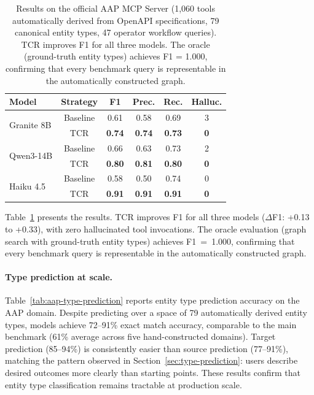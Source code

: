 \begin{table}[t]
\centering
\small
\begin{tabular}{l c c c c c}
\toprule
\textbf{Model} & \textbf{Strategy} & \textbf{F1} & \textbf{Prec.} & \textbf{Rec.} & \textbf{Halluc.} \\
\midrule
\multirow{2}{*}{Granite 8B}
    & Baseline & 0.61 & 0.58 & 0.69 & 3 \\
    & TCR      & \textbf{0.74} & \textbf{0.74} & \textbf{0.73} & \textbf{0} \\
\midrule
\multirow{2}{*}{Qwen3-14B}
    & Baseline & 0.66 & 0.63 & 0.73 & 2 \\
    & TCR      & \textbf{0.80} & \textbf{0.81} & \textbf{0.80} & \textbf{0} \\
\midrule
\multirow{2}{*}{Haiku 4.5}
    & Baseline & 0.58 & 0.50 & 0.74 & 0 \\
    & TCR      & \textbf{0.91} & \textbf{0.91} & \textbf{0.91} & \textbf{0} \\
\bottomrule
\end{tabular}
\caption{Results on the official AAP MCP Server (1,060 tools automatically derived from OpenAPI specifications, 79 canonical entity types, 47 operator workflow queries). TCR improves F1 for all three models. The oracle (ground-truth entity types) achieves F1 = 1.000, confirming that every benchmark query is representable in the automatically constructed graph.}
\label{tab:aap-results}
\end{table}

Table~\ref{tab:aap-results} presents the results.
TCR improves F1 for all three models ($\Delta$F1: +0.13 to +0.33), with zero hallucinated tool invocations.
The oracle evaluation (graph search with ground-truth entity types) achieves F1~=~1.000, confirming that every benchmark query is representable in the automatically constructed graph.

\paragraph{Type prediction at scale.}

Table~\ref{tab:aap-type-prediction} reports entity type prediction accuracy on the AAP domain.
Despite predicting over a space of 79 automatically derived entity types, models achieve 72--91\% exact match accuracy, comparable to the main benchmark (61\% average across five hand-constructed domains).
Target prediction (85--94\%) is consistently easier than source prediction (77--91\%), matching the pattern observed in Section~\ref{sec:type-prediction}: users describe desired outcomes more clearly than starting points.
These results confirm that entity type classification remains tractable at production scale.


